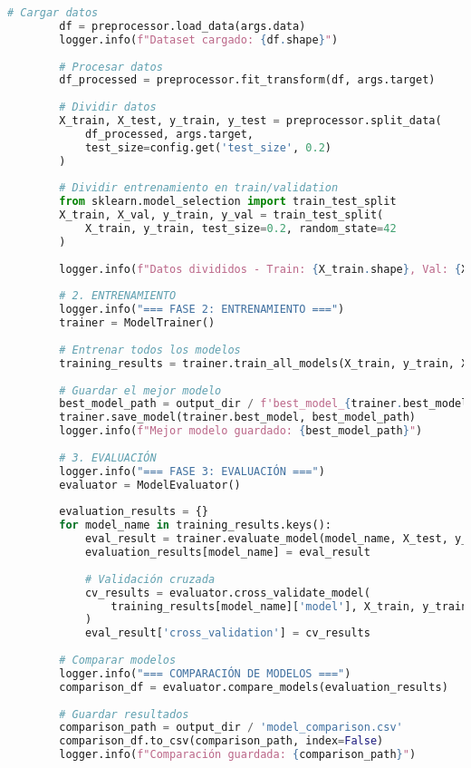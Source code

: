 \begin{lstlisting}[language=Python, caption=Script principal de ejecución]
        # Cargar datos
        df = preprocessor.load_data(args.data)
        logger.info(f"Dataset cargado: {df.shape}")
        
        # Procesar datos
        df_processed = preprocessor.fit_transform(df, args.target)
        
        # Dividir datos
        X_train, X_test, y_train, y_test = preprocessor.split_data(
            df_processed, args.target, 
            test_size=config.get('test_size', 0.2)
        )
        
        # Dividir entrenamiento en train/validation
        from sklearn.model_selection import train_test_split
        X_train, X_val, y_train, y_val = train_test_split(
            X_train, y_train, test_size=0.2, random_state=42
        )
        
        logger.info(f"Datos divididos - Train: {X_train.shape}, Val: {X_val.shape}, Test: {X_test.shape}")
        
        # 2. ENTRENAMIENTO
        logger.info("=== FASE 2: ENTRENAMIENTO ===")
        trainer = ModelTrainer()
        
        # Entrenar todos los modelos
        training_results = trainer.train_all_models(X_train, y_train, X_val, y_val)
        
        # Guardar el mejor modelo
        best_model_path = output_dir / f'best_model_{trainer.best_model}.pkl'
        trainer.save_model(trainer.best_model, best_model_path)
        logger.info(f"Mejor modelo guardado: {best_model_path}")
        
        # 3. EVALUACIÓN
        logger.info("=== FASE 3: EVALUACIÓN ===")
        evaluator = ModelEvaluator()
        
        evaluation_results = {}
        for model_name in training_results.keys():
            eval_result = trainer.evaluate_model(model_name, X_test, y_test)
            evaluation_results[model_name] = eval_result
            
            # Validación cruzada
            cv_results = evaluator.cross_validate_model(
                training_results[model_name]['model'], X_train, y_train
            )
            eval_result['cross_validation'] = cv_results
        
        # Comparar modelos
        logger.info("=== COMPARACIÓN DE MODELOS ===")
        comparison_df = evaluator.compare_models(evaluation_results)
        
        # Guardar resultados
        comparison_path = output_dir / 'model_comparison.csv'
        comparison_df.to_csv(comparison_path, index=False)
        logger.info(f"Comparación guardada: {comparison_path}")
        

\end{lstlisting}
